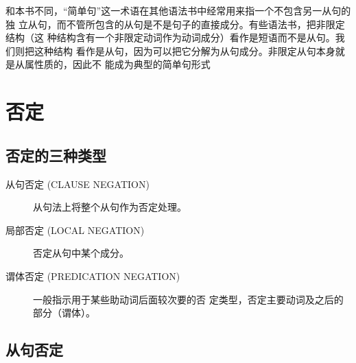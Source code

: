 和本书不同，“简单句”这一术语在其他语法书中经常用来指一个不包含另一从句的独
立从句，而不管所包含的从句是不是句子的直接成分。有些语法书，把非限定结构（这
种结构含有一个非限定动词作为动词成分）看作是短语而不是从句。我们则把这种结构
看作是从句，因为可以把它分解为从句成分。非限定从句本身就是从属性质的，因此不
能成为典型的简单句形式


\section{否定}

\subsection{否定的三种类型}
\begin{description}
\item[从句否定 (CLAUSE NEGATION)] 从句法上将整个从句作为否定处理。

\item[局部否定 (LOCAL NEGATION)] 否定从句中某个成分。

\item[谓体否定 (PREDICATION NEGATION)] 一般指示用于某些助动词后面较次要的否
  定类型，否定主要动词及之后的部分（谓体）。
\end{description}

\subsection{从句否定}


